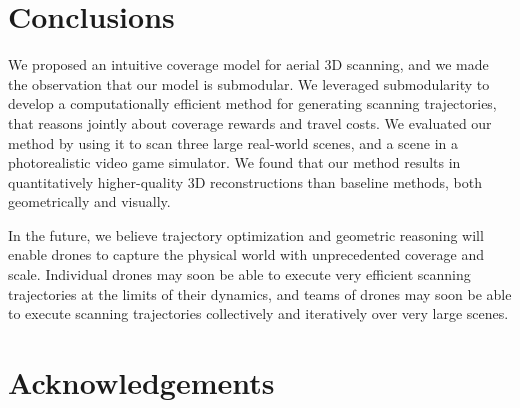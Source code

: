 \vspace{-5pt}
\section{Conclusions}
\vspace{-1pt}

We proposed an intuitive coverage model for aerial 3D scanning, and we made the observation that our model is submodular.
We leveraged submodularity to develop a computationally efficient method for generating scanning trajectories, that reasons jointly about coverage rewards and travel costs.
We evaluated our method by using it to scan three large real-world scenes, and a scene in a photorealistic video game simulator.
We found that our method results in quantitatively higher-quality 3D reconstructions than baseline methods, both geometrically and visually.




In the future, we believe trajectory optimization and geometric reasoning will enable drones to capture the physical world with unprecedented coverage and scale.
Individual drones may soon be able to execute very efficient scanning trajectories at the limits of their dynamics, and teams of drones may soon be able to execute scanning trajectories collectively and iteratively over very large scenes.

\vspace{-6pt}
\section*{Acknowledgements}
\vspace{-3pt}

